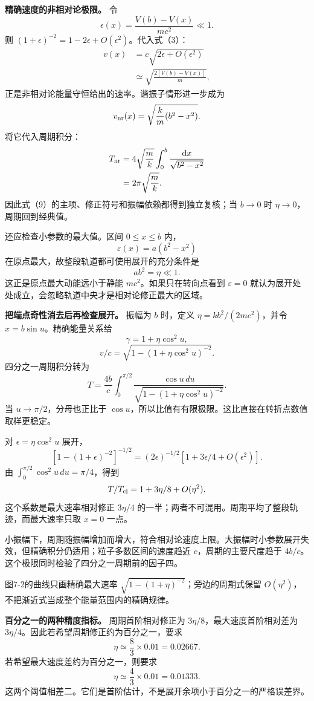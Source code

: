 \documentclass[12pt,a4paper,UTF8]{ctexart}
\begin{document}
\textbf{精确速度的非相对论极限。} 令 \[
\epsilon(x)=\frac{V(b)-V(x)}{mc^2}\ll1.
\] 则 \((1+\epsilon)^{-2}=1-2\epsilon+O(\epsilon^2)\)。代入式（3）： \[
\begin{aligned}
v(x)
&=c\sqrt{2\epsilon+O(\epsilon^2)}\\
&\simeq\sqrt{\frac{2[V(b)-V(x)]}{m}},
\end{aligned}
\] 正是非相对论能量守恒给出的速率。谐振子情形进一步成为 \[
v_{\rm nr}(x)=\sqrt{\frac km(b^2-x^2)}.
\] 将它代入周期积分： \[
\begin{aligned}
T_{\rm nr}
&=4\sqrt{\frac mk}
\int_0^b\frac{\mathrm dx}{\sqrt{b^2-x^2}}\\
&=2\pi\sqrt{\frac mk}.
\end{aligned}
\] 因此式（9）的主项、修正符号和振幅依赖都得到独立复核；当 \(b\to0\) 时
\(\eta\to0\)，周期回到经典值。

还应检查小参数的最大值。区间 \(0\le x\le b\) 内， \[
\varepsilon(x)=a(b^2-x^2)
\] 在原点最大，故整段轨道都可使用展开的充分条件是 \[
ab^2=\eta\ll1.
\] 这正是原点最大动能远小于静能 \(mc^2\)。如果只在转向点看到
\(\varepsilon=0\)
就认为展开处处成立，会忽略轨道中央才是相对论修正最大的区域。

\textbf{把端点奇性消去后再检查展开。} 振幅为 \(b\) 时，定义
\(\eta=kb^2/(2mc^2)\)，并令 \(x=b\sin u\)。精确能量关系给 \[
\gamma=1+\eta\cos^2u,
\] \[
v/c=\sqrt{1-(1+\eta\cos^2u)^{-2}}.
\] 四分之一周期积分转为 \[
T=\frac{4b}{c}\int_0^{\pi/2}\frac{\cos u\,du}{\sqrt{1-(1+\eta\cos^2u)^{-2}}}.
\] 当 \(u\to\pi/2\)，分母也正比于
\(\cos u\)，所以比值有有限极限。这比直接在转折点数值取样更稳定。

对 \(\epsilon=\eta\cos^2u\) 展开， \[
[1-(1+\epsilon)^{-2}]^{-1/2}
=(2\epsilon)^{-1/2}[1+3\epsilon/4+O(\epsilon^2)].
\] 由 \(\int_0^{\pi/2}\cos^2u\,du=\pi/4\)，得到 \[
T/T_{\rm cl}=1+3\eta/8+O(\eta^2).
\] 这个系数是最大速率相对修正 \(3\eta/4\)
的一半；两者不可混用。周期平均了整段轨迹，而最大速率只取 \(x=0\) 一点。

小振幅下，周期随振幅增加而增大，符合相对论速度上限。大振幅时小参数展开失效，但精确积分仍适用；粒子多数区间的速度趋近
\(c\)，周期的主要尺度趋于
\(4b/c\)。这个极限同时检验了四分之一周期前的因子四。

图7-2的曲线只画精确最大速率 \(\sqrt{1-(1+\eta)^{-2}}\)；旁边的周期式保留
\(O(\eta^2)\)，不把渐近式当成整个能量范围内的精确规律。

\textbf{百分之一的两种精度指标。} 周期首阶相对修正为
\(3\eta/8\)，最大速度首阶相对差为
\(3\eta/4\)。因此若希望周期修正约为百分之一，要求 \[
\eta\simeq\frac8{3}\times0.01=0.02667.
\] 若希望最大速度差约为百分之一，则要求 \[
\eta\simeq\frac4{3}\times0.01=0.01333.
\]
这两个阈值相差二。它们是首阶估计，不是展开余项小于百分之一的严格误差界。
\end{document}
